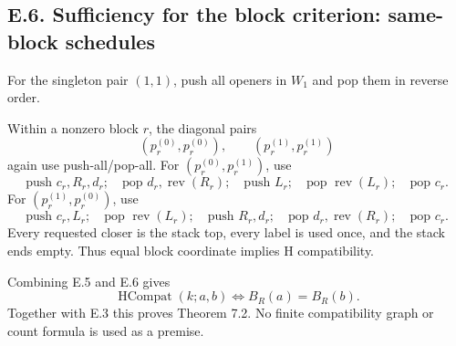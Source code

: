 \documentclass[11pt]{article}
\theoremstyle{definition}
\theoremstyle{remark}
\begin{document}
\subsection{E.6. Sufficiency for the block criterion: same-block
schedules}\label{e.6.-sufficiency-for-the-block-criterion-same-block-schedules}

For the singleton pair \((1,1)\), push all openers in \(W_1\) and pop
them in reverse order.

Within a nonzero block \(r\), the diagonal pairs \[
(p_r^{(0)},p_r^{(0)}),
\qquad
(p_r^{(1)},p_r^{(1)})
\] again use push-all/pop-all. For \((p_r^{(0)},p_r^{(1)})\), use \[
\text{push }c_r,R_r,d_r;\quad
\text{pop }d_r,\operatorname{rev}(R_r);\quad
\text{push }L_r;\quad
\text{pop }\operatorname{rev}(L_r);\quad
\text{pop }c_r.
\] For \((p_r^{(1)},p_r^{(0)})\), use \[
\text{push }c_r,L_r;\quad
\text{pop }\operatorname{rev}(L_r);\quad
\text{push }R_r,d_r;\quad
\text{pop }d_r,\operatorname{rev}(R_r);\quad
\text{pop }c_r.
\] Every requested closer is the stack top, every label is used once,
and the stack ends empty. Thus equal block coordinate implies H
compatibility.

Combining E.5 and E.6 gives \[
\operatorname{HCompat}(k;a,b)
\iff
B_R(a)=B_R(b).
\] Together with E.3 this proves Theorem 7.2. No finite compatibility
graph or count formula is used as a premise.
\end{document}
